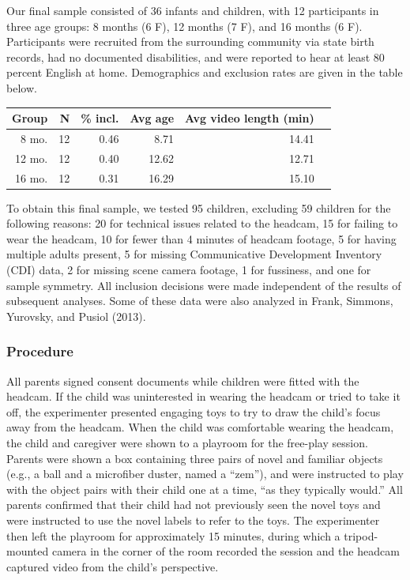 \documentclass[english,man,floatsintext,draftall]{apa6}
\begin{document}
Our final sample consisted of 36 infants and children, with 12
participants in three age groups: 8 months (6 F), 12 months (7 F), and
16 months (6 F). Participants were recruited from the surrounding
community via state birth records, had no documented disabilities, and
were reported to hear at least 80 percent English at home. Demographics
and exclusion rates are given in the table below.

\begin{table}[ht]
\centering
\begin{tabular}{rrrrrr}
\hline
Group & N & \% incl. & Avg age & Avg video length (min) \\
\hline
8 mo. &   12 & 0.46 & 8.71 & 14.41 \\
12 mo. &  12 & 0.40 & 12.62 & 12.71 \\
16 mo. &  12 & 0.31 & 16.29 & 15.10\\
\hline
\end{tabular}
\end{table}

To obtain this final sample, we tested 95 children, excluding 59
children for the following reasons: 20 for technical issues related to
the headcam, 15 for failing to wear the headcam, 10 for fewer than 4
minutes of headcam footage, 5 for having multiple adults present, 5 for
missing Communicative Development Inventory (CDI) data, 2 for missing
scene camera footage, 1 for fussiness, and one for sample symmetry. All
inclusion decisions were made independent of the results of subsequent
analyses. Some of these data were also analyzed in Frank, Simmons,
Yurovsky, and Pusiol (2013).

\subsubsection{Procedure}\label{procedure}

All parents signed consent documents while children were fitted with the
headcam. If the child was uninterested in wearing the headcam or tried
to take it off, the experimenter presented engaging toys to try to draw
the child's focus away from the headcam. When the child was comfortable
wearing the headcam, the child and caregiver were shown to a playroom
for the free-play session. Parents were shown a box containing three
pairs of novel and familiar objects (e.g., a ball and a microfiber
duster, named a \enquote{zem}), and were instructed to play with the
object pairs with their child one at a time, \enquote{as they typically
would.} All parents confirmed that their child had not previously seen
the novel toys and were instructed to use the novel labels to refer to
the toys. The experimenter then left the playroom for approximately 15
minutes, during which a tripod-mounted camera in the corner of the room
recorded the session and the headcam captured video from the child's
perspective.
\end{document}
